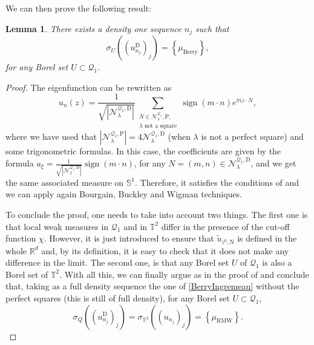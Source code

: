 \documentclass{amsart}
\newtheorem{lemma}[theorem]{Lemma}
\theoremstyle{definition}
\theoremstyle{remark}
\def\RR{\mathbb{R}}
\newcommand{\sign}{\operatorname{sign}}
\numberwithin{equation}{section}
\theoremstyle{definition}
\theoremstyle{remark}
\def\RR{\mathbb{R}}
\newcommand\muRMW{\mu_{\mathrm{RMW}}}
\begin{document}
We can then prove the following result: 
\begin{lemma}\label{BD}
	There exists a density one sequence $n_j$ such that  \begin{equation}
		\sigma_{U}\left((u_{n_j}^\mathrm{D})_j\right)=\left\{\mu_{\text{Berry}}\right\},
	\end{equation}for any Borel set $U\subset\mathcal{Q}_1$.
\end{lemma}\begin{proof}
	The eigenfunction can be rewritten as 
	\begin{equation}
		u_{n}(z)=\frac{1}{\sqrt{\left|\mathcal{N}_\lambda^{\mathcal{Q}_1,\mathrm{D}}\right|}}\sum_{\substack{N\in\mathcal{N}_\lambda^{\mathcal{Q}_1},\mathrm{P},\\ \lambda\text{ not a square}}}\sign\left(m\cdot n\right)e^{\pi i z\cdot N},
	\end{equation} where we have used that $\left|\mathcal{N}_\lambda^{\mathcal{Q}_1,\mathrm{P}}\right|=4\mathcal{N}_\lambda^{\mathcal{Q}_1,\mathrm{D}}$ (when $\lambda$ is not a perfect square) and some trigonometric formulas. In this case, the coefficients are given by the formula $a_\xi=\frac{1}{\sqrt{\left|\mathcal{N}_\lambda^{\mathcal{Q}_1,\mathrm{D}}\right|}}\sign\left(m\cdot n\right)$, for any $N=(m,n)\in\mathcal{N}_\lambda^{\mathcal{Q}_1,\mathrm{D}}$, and we get the same associated measure on $\mathbb{S}^1$. Therefore, it satisfies the  conditions of \cite[Hypothesis 1]{Ingremeau} and we can apply again Bourgain, Buckley and Wigman techniques.
	
To conclude the proof, one needs to take into account two things. The first one is that local weak measures in $\mathcal{Q}_1$ and in $\mathbb{T}^2$ differ in the presence of the cut-off function $\chi$. However, it is just introduced to ensure that $\tilde{u}_{z^0,\mathrm{N}}$ is defined in the whole $\RR^d$ and, by its definition, it is easy to check that it does not make any difference in the limit. The second one, is that any Borel set $U$ of $\mathcal{Q}_1$ is also a Borel set of $\mathbb{T}^2$. With all this, we can finally argue as in the proof of \cite[Theorem 2]{Ingremeau} and conclude that, taking as a full density sequence the one of \ref{BerryIngremeau} without the perfect squares (this is still of full density), for any Borel set $U\subset\mathcal{Q}_1$, \begin{equation}
		\sigma_{Q}\left((u_{n_j}^\mathrm{D})_j\right)=	\sigma_{\mathbb{T}^2}\left((u_{n_j})_j\right)=\left\{\muRMW\right\}.
	\end{equation}
\end{proof}
\end{document}
